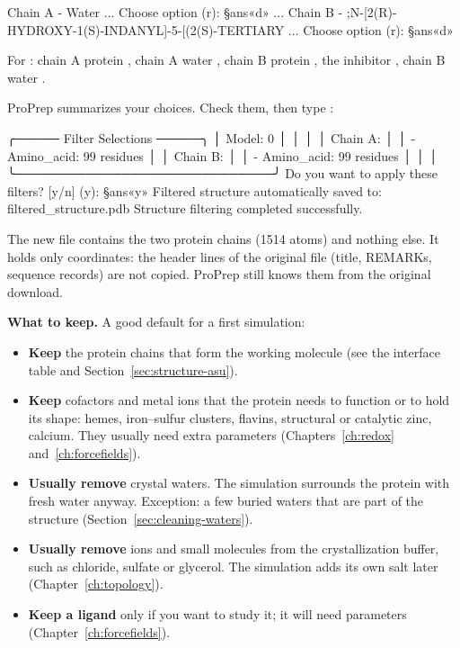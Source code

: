 \begin{steps}
\begin{screen}
Chain A - Water
...
Choose option (r): §ans«d»
...
Chain B - ;N-[2(R)-HYDROXY-1(S)-INDANYL]-5-[(2(S)-TERTIARY
...
Choose option (r): §ans«d»
\end{screen}
        For : chain A protein , chain A water , chain B
        protein , the inhibitor , chain B water .
  \item ProPrep summarizes your choices. Check them, then type :
\begin{screen}
╭───── Filter Selections ─────╮
│ Model: 0                    │
│                             │
│ Chain A:                    │
│   - Amino_acid: 99 residues │
│ Chain B:                    │
│   - Amino_acid: 99 residues │
│                             │
╰─────────────────────────────╯
Do you want to apply these filters? [y/n] (y): §ans«y»
Filtered structure automatically saved to: filtered_structure.pdb
Structure filtering completed successfully.
\end{screen}
\end{steps}

The new file  contains the two protein chains
(1514 atoms) and nothing else. It holds only coordinates: the header lines of
the original file (title, REMARKs, sequence records) are not copied. ProPrep
still knows them from the original download.

\begin{tip}
\textbf{What to keep.} A good default for a first simulation:
\begin{itemize}
  \item \textbf{Keep} the protein chains that form the working molecule (see
        the interface table and Section~\ref{sec:structure-asu}).
  \item \textbf{Keep} cofactors and metal ions that the protein needs to
        function or to hold its shape: hemes, iron--sulfur clusters, flavins,
        structural or catalytic zinc, calcium. They usually need extra
        parameters (Chapters~\ref{ch:redox} and~\ref{ch:forcefields}).
  \item \textbf{Usually remove} crystal waters. The simulation surrounds the
        protein with fresh water anyway. Exception: a few buried waters that
        are part of the structure (Section~\ref{sec:cleaning-waters}).
  \item \textbf{Usually remove} ions and small molecules from the
        crystallization buffer, such as chloride, sulfate or glycerol. The
        simulation adds its own salt later (Chapter~\ref{ch:topology}).
  \item \textbf{Keep a ligand} only if you want to study it; it will need
        parameters (Chapter~\ref{ch:forcefields}).
\end{itemize}
\end{tip}

